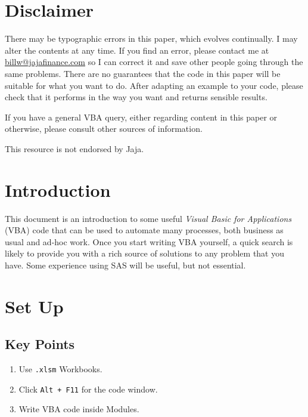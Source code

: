 \documentclass[11pt]{article}%
\makeatletter
\newcommand{\email}{billw@jajafinance.com}
\newcommand{\company}{Jaja}
\makeatother
\begin{document}
\recipetitle

\section*{Disclaimer}

There may be typographic errors in this paper, which evolves continually. I may alter the contents at any time. If you find an error, please contact me at \href{mailto:\email}{\email} so I can correct it and save other people going through the same problems. There are no guarantees that the code in this paper will be suitable for what you want to do. After adapting an example to your code, please check that it performs in the way you want and returns sensible results.

If you have a general VBA query, either regarding content in this paper or otherwise, please consult other sources of information.

This resource is not endorsed by \company.

\tableofcontents

\section*{Introduction}

This document is an introduction to some useful \textit{Visual Basic for Applications} (VBA) code that can be used to automate many processes, both business as usual and ad-hoc work. Once you start writing VBA yourself, a quick \href{https://www.google.co.uk/}{\Google} search is likely to provide you with a rich source of solutions to any problem that you have. Some experience using SAS will be useful, but not essential.


\section{Set Up}


\subsection{Key Points}

\begin{enumerate}
    \item Use \texttt{.xlsm} Workbooks.
    \item Click \texttt{Alt + F11} for the code window.
    \item Write VBA code inside Modules.
\end{enumerate}
\end{document}
